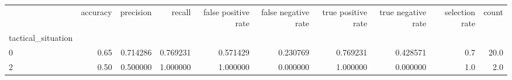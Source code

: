 \begin{tabular}{lrrrrrrrrr}
\toprule
{} &  accuracy &  precision &    recall &  false positive rate &  false negative rate &  true positive rate &  true negative rate &  selection rate &  count \\
tactical\_situation &           &            &           &                      &                      &                     &                     &                 &        \\
\midrule
0                  &      0.65 &   0.714286 &  0.769231 &             0.571429 &             0.230769 &            0.769231 &            0.428571 &             0.7 &   20.0 \\
2                  &      0.50 &   0.500000 &  1.000000 &             1.000000 &             0.000000 &            1.000000 &            0.000000 &             1.0 &    2.0 \\
\bottomrule
\end{tabular}
